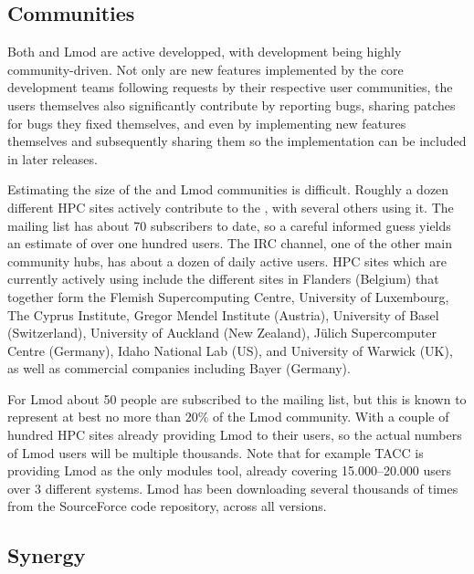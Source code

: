 \subsection{Communities}

Both \easybuild{} and Lmod are active developped, with development being
highly community-driven. Not only are new features implemented by the core
development teams following requests by their respective user communities, the
users themselves also significantly contribute by reporting bugs, sharing patches
for bugs they fixed themselves, and even by implementing new features themselves
and subsequently sharing them so the implementation can be included in later
releases.

Estimating the size of the \easybuild{} and Lmod communities is difficult.
Roughly a dozen different HPC sites actively contribute to the \easybuild{}, with
several others using it. The \easybuild{} mailing list has about 70 subscribers
to date, so a careful informed guess yields an estimate of over one hundred
users. The \easybuild{} IRC channel, one of the other main community hubs, has
about a dozen of daily active users. HPC sites which are currently actively using
\easybuild{} include the different sites in Flanders (Belgium) that together form
the Flemish Supercomputing Centre, University of Luxembourg, The Cyprus Institute,
Gregor Mendel Institute (Austria), University of Basel (Switzerland), University
of Auckland (New Zealand), J\"ulich Supercomputer Centre (Germany), Idaho
National Lab (US), and University of Warwick (UK), as well as commercial
companies including Bayer (Germany).

For Lmod about 50 people are subscribed to the mailing list, but this
is known to represent at best no more than $20\%$ of the Lmod community. With a
couple of hundred HPC sites already providing Lmod to their users, so the actual
numbers of Lmod users will be multiple thousands. Note that for example TACC is
providing Lmod as the only modules tool, already covering 15.000--20.000 users
over 3 different systems. Lmod has been downloading several thousands of times
from the SourceForce code repository, across all versions.

\subsection{Synergy}

